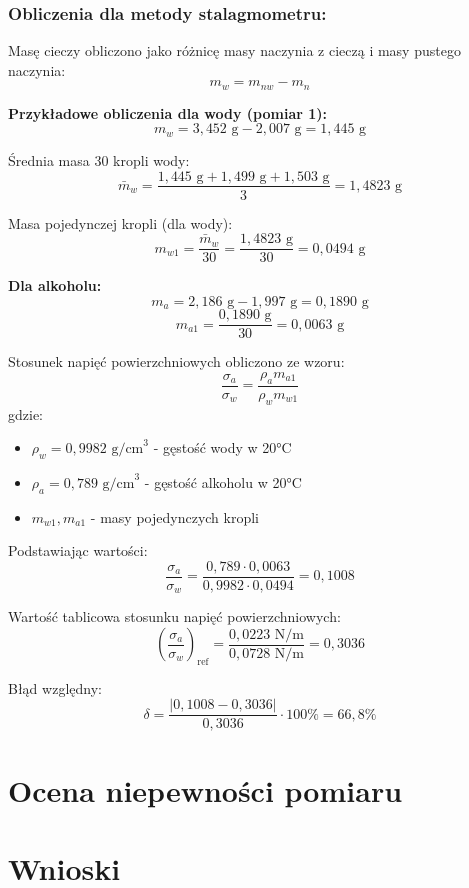\documentclass[a4paper,12pt]{article}
\begin{document}
\subsubsection{Obliczenia dla metody stalagmometru:}

Masę cieczy obliczono jako różnicę masy naczynia z cieczą i masy pustego naczynia:
$$m_w = m_{nw} - m_n$$

\noindent\textbf{Przykładowe obliczenia dla wody (pomiar 1):}
$$m_w = 3{,}452\text{ g} - 2{,}007\text{ g} = 1{,}445\text{ g}$$

Średnia masa 30 kropli wody:
$$\bar{m}_w = \frac{1{,}445\text{ g} + 1{,}499\text{ g} + 1{,}503\text{ g}}{3} = 1{,}4823\text{ g}$$

Masa pojedynczej kropli (dla wody):
$$m_{w1} = \frac{\bar{m}_w}{30} = \frac{1{,}4823\text{ g}}{30} = 0{,}0494\text{ g}$$

\noindent\textbf{Dla alkoholu:}
$$m_a = 2{,}186\text{ g} - 1{,}997\text{ g} = 0{,}1890\text{ g}$$
$$m_{a1} = \frac{0{,}1890\text{ g}}{30} = 0{,}0063\text{ g}$$

Stosunek napięć powierzchniowych obliczono ze wzoru:
$$\frac{\sigma_a}{\sigma_w} = \frac{\rho_a m_{a1}}{\rho_w m_{w1}}$$
gdzie:
\begin{itemize}
    \item $\rho_w = 0{,}9982\text{ g/cm}^3$ - gęstość wody w 20°C
    \item $\rho_a = 0{,}789\text{ g/cm}^3$ - gęstość alkoholu w 20°C
    \item $m_{w1}, m_{a1}$ - masy pojedynczych kropli
\end{itemize}

Podstawiając wartości:
$$\frac{\sigma_a}{\sigma_w} = \frac{0{,}789 \cdot 0{,}0063}{0{,}9982 \cdot 0{,}0494} = 0{,}1008$$

Wartość tablicowa stosunku napięć powierzchniowych:
$$\left(\frac{\sigma_a}{\sigma_w}\right)_{\text{ref}} = \frac{0{,}0223\text{ N/m}}{0{,}0728\text{ N/m}} = 0{,}3036$$

Błąd względny:
$$\delta = \frac{|0{,}1008 - 0{,}3036|}{0{,}3036} \cdot 100\% = 66{,}8\%$$

\section{Ocena niepewności pomiaru}

\section{Wnioski}
\end{document}
